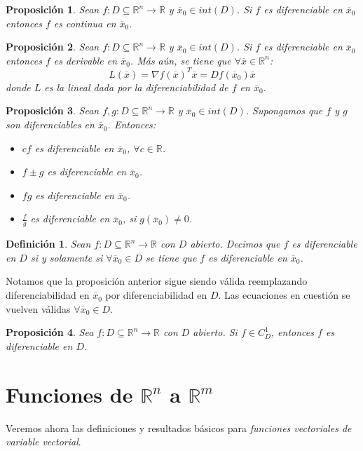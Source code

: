 \documentclass[11pt]{report}
\newtheorem{definition}{Definición}[section]
\newtheorem{proposition}{Proposición}[section]
\newcommand{\Rn}{\mathbb{R}^{n}}
\newcommand{\Rm}{\mathbb{R}^{m}}
\newcommand{\R}{\mathbb{R}}
\newcommand{\x}{\overline{x}}
\newcommand{\xz}{\overline{x}_{0}}
\begin{document}
\begin{proposition}
Sean $f:D\subseteq\Rn\rightarrow\R$ y $\xz\in int(D)$. Si $f$ es diferenciable en $\xz$ entonces $f$ es continua en $\xz$.
\end{proposition}

\begin{proposition}
Sean $f:D\subseteq\Rn\rightarrow\R$ y $\xz\in int(D)$. Si $f$ es diferenciable en $\xz$ entonces $f$ es derivable en $\xz$. Más aún, se tiene que $\forall\x\in\Rn$:
$$L(\x)=\nabla f(\x)^{T}\x=Df(\xz)\x$$
donde $L$ es la lineal dada por la diferenciabilidad de $f$ en $\xz$.
\end{proposition}

\begin{proposition}
Sean $f,g:D\subseteq\Rn\rightarrow\R$ y $\xz\in int(D)$. Supongamos que $f$ y $g$ son diferenciables en $\xz$. Entonces:
\begin{itemize}
\item[(i)] $cf$ es diferenciable en $\xz$, $\forall c\in\R$.
\item[(ii)] $f\pm g$ es diferenciable en $\xz$.
\item[(iii)] $fg$ es diferenciable en $\xz$.
\item[(iv)] $\frac{f}{g}$ es diferenciable en $\xz$, si $g(\xz)\ne0$.
\end{itemize}
\end{proposition}

\begin{definition} Sean $f:D\subseteq\Rn\rightarrow\R$ con $D$ abierto. Decimos que $f$ es diferenciable en $D$ si y solamente si $\forall\xz\in D$ se tiene que $f$ es diferenciable en $\xz$.
\end{definition}
Notamos que la proposición anterior sigue siendo válida reemplazando diferenciabilidad en $\xz$ por diferenciabilidad en $D$. Las ecuaciones en cuestión se vuelven válidas $\forall\xz\in D$.

\begin{proposition}
Sea $f:D\subseteq\Rn\rightarrow\R$ con $D$ abierto. Si $f\in C_{D}^{1}$, entonces $f$ es diferenciable en $D$.
\end{proposition}

\section{Funciones de $\Rn$ a $\Rm$}
Veremos ahora las definiciones y resultados básicos para \emph{funciones vectoriales de variable vectorial}.
\end{document}
